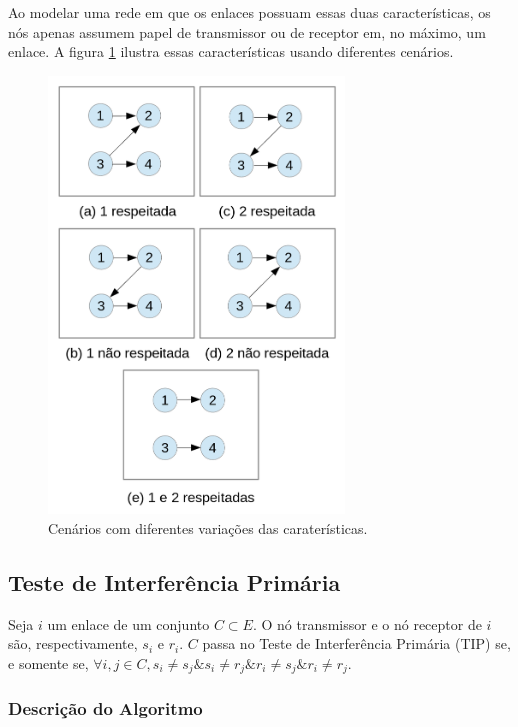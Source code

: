 Ao modelar uma rede em que os enlaces possuam essas duas características, os nós apenas assumem papel de transmissor ou de receptor em, no máximo, um enlace. A figura \ref{fig:primario} ilustra essas características usando diferentes cenários.

\begin{figure}[htb]
\centering
\includegraphics[width=0.7\textwidth]{figs/primario}
\caption[Cenários com diferentes variações das caraterísticas.]
{Cenários com diferentes variações das caraterísticas.}
\label{fig:primario}
\end{figure}

\subsection{Teste de Interferência Primária}

Seja $i$ um enlace de um conjunto $C \subset E$. O nó transmissor e o nó receptor de $i$ são, respectivamente, $s_{i}$ e $r_{i}$. $C$ passa no Teste de Interferência Primária (TIP) se, e somente se, $\forall i,j \in C, s_{i} \neq s_{j} \& s_{i} \neq r_{j} \& r_{i} \neq s_{j} \& r_{i} \neq r_{j}$. 

\subsubsection{Descrição do Algoritmo}

